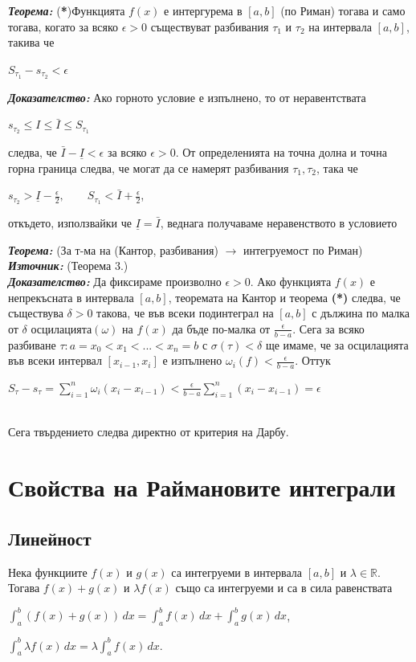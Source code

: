 \documentclass[11pt]{article} %
\newcommand{\italicBold}[1]{\textbf{\emph{#1}}}
\newcommand{\theorem}{\italicBold{Теорема: }}
\newcommand{\proof}{\italicBold{Доказателство: }}
\newcommand{\source}{\italicBold{Източник: }}
\newcommand{\integral}[4]{\displaystyle \int_{#1}^{#2}#3\,#4}
\begin{document}
\theorem (\textbf{*})Функцията $f(x)$ е интергурема в $[a,b]$ (по Риман) тогава и само тогава, когато за всяко $\epsilon > 0$ съществуват разбивания $\tau_{1}$ и $\tau_{2}$ на интервала $[a,b]$, такива че \\
\centerline{$S_{\tau_1}-s_{\tau_2} < \epsilon$}
\proof Ако горното условие е изпълнено, то от неравентствата\\
\centerline{$s_{\tau_2} \leq I \leq \bar{I} \leq S_{\tau_1}$}
следва, че $\bar{I}-\underline{I} < \epsilon$ за всяко $\epsilon > 0$. От определенията на точна долна и точна горна граница следва, че могат да се намерят разбивания $\tau_{1}, \tau_{2}$, така че\\
\centerline{$s_{\tau_2} > \underline{I}-\frac{\epsilon}{2}, \qquad S_{\tau_1} < \bar{I} + \frac{\epsilon}{2}$,}
откъдето, използвайки че $\underline{I} = \bar{I}$, веднага получаваме неравенството в условието\\\par

\theorem (За т-ма на (Кантор, разбивания) $\rightarrow$ интегруемост по Риман)
\source {} (Теорема 3.) \\
\proof Да фиксираме произволно $\epsilon > 0$. Ако функцията $f(x)$ е непрекъсната в интервала $[a,b]$, теоремата на Кантор и теорема \textbf{(*)} следва, че съществува $\delta > 0$ такова, че във всеки подинтеграл на $[a,b]$ с дължина по малка от $\delta$ осцилацията$(\omega)$ на $f(x)$ да бъде по-малка от $\frac{\epsilon}{b-a}$. Сега за всяко разбиване $\tau : a = x_{0} < x_{1} < ... < x_{n} = b$ с $\sigma(\tau) < \delta$ ще имаме, че за осцилацията във всеки интервал $[x_{i-1}, x_{i}]$ е изпълнено $\omega_{i}(f) < \frac{\epsilon}{b-a}$. Оттук\\
\centerline{$S_{\tau}-s_{\tau}=\displaystyle \sum_{i=1}^{n}\omega_{i}(x_{i}-x_{i-1}) < \frac{\epsilon}{b-a}\sum_{i=1}^{n}(x_{i}-x_{i-1})=\epsilon$}\\
Сега твърдението следва директно от критерия на Дарбу.

\section{Свойства на Раймановите интеграли}
\subsection{Линейност}
Нека функциите $f(x)$ и $g(x)$ са интегруеми в интервала $[a,b]$ и $\lambda \in \mathbb{R}$. Тогава $f(x)+g(x)$ и $\lambda f(x)$ също са интегруеми и са в сила равенствата \\
\centerline{$\integral{a}{b}{(f(x)+g(x))}{dx}=\integral{a}{b}{f(x)}{dx}+\integral{a}{b}{g(x)}{dx}$,}
\centerline{$\integral{a}{b}{\lambda f(x)}{dx} = \lambda \integral{a}{b}{f(x)}{dx}$.}
\end{document}
